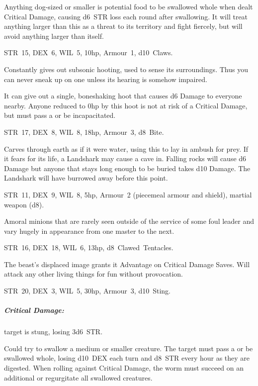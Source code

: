 \documentclass[itdr]{subfiles}
\begin{document}
Anything dog-sized or smaller is potential food to be swallowed whole when dealt Critical Damage, causing d6~STR loss each round after swallowing. It will treat anything larger than this as a threat to its territory and fight fiercely, but will avoid anything larger than itself.


STR~15, DEX~6, WIL~5, 10hp, Armour~1, d10~Claws.

Constantly gives out subsonic hooting, used to sense its surroundings. Thus you can never sneak up on one unless its hearing is somehow impaired.

It can give out a single, boneshaking hoot that causes d6 Damage to everyone nearby. Anyone reduced to 0hp by this hoot is not at risk of a Critical Damage, but must pass a  or be incapacitated.



STR~17, DEX~8, WIL~8, 18hp, Armour~3, d8~Bite.

Carves through earth as if it were water, using this to lay in ambush for prey. If it fears for its life, a Landshark may cause a cave in. Falling rocks will cause d6 Damage but anyone that stays long enough to be buried takes d10 Damage. The Landshark will have burrowed away before this point.

\vfill
\break

STR~11, DEX~9, WIL~8, 5hp, Armour~2 (piecemeal armour and shield), martial weapon (d8).

Amoral minions that are rarely seen outside of the service of some foul leader and vary hugely in appearance from one master to the next.


STR~16, DEX~18, WIL~6, 13hp, d8~Clawed~Tentacles.

The beast's displaced image grants it Advantage on Critical Damage Saves. Will attack any other living things for fun without provocation.


STR~20, DEX~3, WIL~5, 30hp, Armour~3, d10~Sting.

\subparagraph{Critical Damage:} target is stung, losing 3d6~STR.

Could try to swallow a medium or smaller creature. The target must pass a  or be swallowed whole, losing d10~DEX each turn and d8~STR every hour as they are digested. When rolling against Critical Damage, the worm must succeed on an additional  or regurgitate all swallowed creatures.

\end{document}

